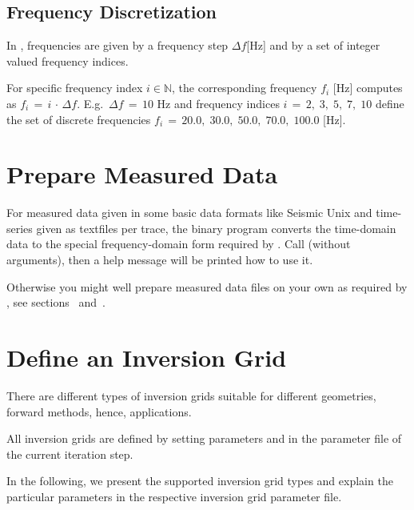 \subsection*{Frequency Discretization}
%
In \ASKI, frequencies are given by a frequency step $\Delta f$[Hz] and by a set of integer valued 
frequency indices.

For specific frequency index $i\in\mathbb{N}$, the corresponding frequency $f_i$ [Hz] computes as $f_i \,=\, i \,\cdot\, \Delta f$.
E.g.\ $\Delta f \,=\, 10$ Hz and frequency indices $i \,=\, 2,\; 3,\; 5,\; 7,\; 10$ define the set of 
discrete frequencies $f_i \,=\, 20.0,\; 30.0,\; 50.0,\; 70.0,\; 100.0$ [Hz].
%
\section{Prepare Measured Data} \label{basic_steps,sec:measured_data}
%
For measured data given in some basic data formats like Seismic Unix and time-series given as textfiles per trace,
the binary program   
converts the time-domain data to the special frequency-domain
form required by \ASKI. Call  (without arguments), then a help message will be printed how to use it.

Otherwise you might well prepare measured data files on your own as required by \ASKI, see sections~ 
and~. 
%
\section{Define an Inversion Grid} \label{basic_steps,sec:invgrid}
%
There are different types of \ASKI inversion grids suitable for different geometries, 
forward methods, hence, applications.

All inversion grids are defined by setting parameters  and 
 in the parameter file of the current iteration step.

In the following, we present the supported inversion grid types and explain the particular
parameters in the respective inversion grid parameter file.
%
